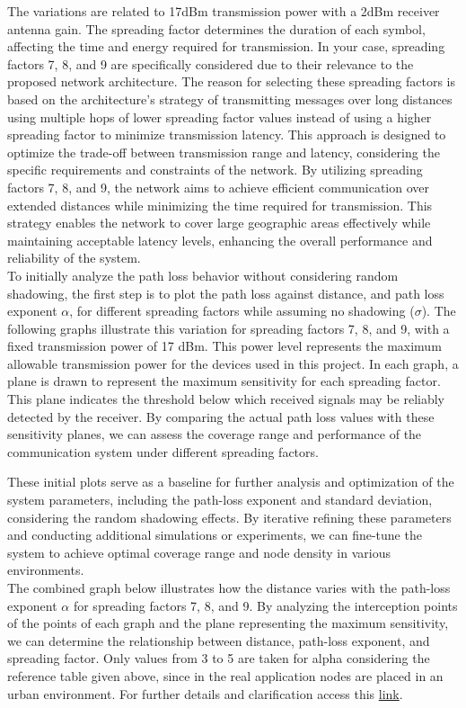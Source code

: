 The variations are related to 17dBm transmission power with a 2dBm receiver antenna gain. The spreading factor determines the duration of each symbol, affecting the time and energy required for transmission. In your case, spreading factors 7, 8, and 9 are specifically considered due to their relevance to the proposed network architecture. The reason for selecting these spreading factors is based on the architecture's strategy of transmitting messages over long distances using multiple hops of lower spreading factor values instead of using a higher spreading factor to minimize transmission latency. This approach is designed to optimize the trade-off between transmission range and latency, considering the specific requirements and constraints of the network. By utilizing spreading factors 7, 8, and 9, the network aims to achieve efficient communication over extended distances while minimizing the time required for transmission. This strategy enables the network to cover large geographic areas effectively while maintaining acceptable latency levels, enhancing the overall performance and reliability of the system.\\

To initially analyze the path loss behavior without considering random shadowing, the first step is to plot the path loss against distance, and path loss exponent $\alpha$, for different spreading factors while assuming no shadowing ($\sigma$). The following graphs illustrate this variation for spreading factors 7, 8, and 9, with a fixed transmission power of 17 dBm. This power level represents the maximum allowable transmission power for the devices used in this project. In each graph, a plane is drawn to represent the maximum sensitivity for each spreading factor. This plane indicates the threshold below which received signals may be reliably detected by the receiver. By comparing the actual path loss values with these sensitivity planes, we can assess the coverage range and performance of the communication system under different spreading factors.

These initial plots serve as a baseline for further analysis and optimization of the system parameters, including the path-loss exponent and standard deviation, considering the random shadowing effects. By iterative refining these parameters and conducting additional simulations or experiments, we can fine-tune the system to achieve optimal coverage range and node density in various environments.\\

The combined graph below illustrates how the distance varies with the path-loss exponent $\alpha$ for spreading factors 7, 8, and 9. By analyzing the interception points of the points of each graph and the plane representing the maximum sensitivity, we can determine the relationship between distance, path-loss exponent, and spreading factor. Only values from 3 to 5 are taken for alpha considering the reference table given above, since in the real application nodes are placed in an urban environment. For further details and clarification access this \href{https://colab.research.google.com/drive/1Qwp6aWWC2aQOnpKNQn7393luhTESWTYo#scrollTo=UuDD7vf8jCxN}{link}. \\


